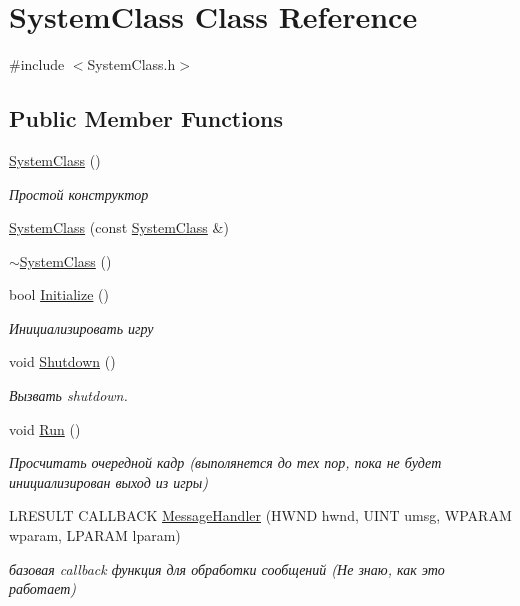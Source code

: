 \hypertarget{class_system_class}{}\section{System\+Class Class Reference}
\label{class_system_class}


{\ttfamily \#include $<$System\+Class.\+h$>$}

\subsection*{Public Member Functions}
\begin{DoxyCompactItemize}
\item 
\hyperlink{class_system_class_ac8a9c3545ea8749f149a49219d5f7c20}{System\+Class} ()
\begin{DoxyCompactList}\small\item\em Простой конструктор \end{DoxyCompactList}\item 
\hyperlink{class_system_class_a3b14141f929e92fb9cf9a73bb88ce443}{System\+Class} (const \hyperlink{class_system_class}{System\+Class} \&)
\item 
\hyperlink{class_system_class_aa0c6aed1875b97d8260ad264a9d95e60}{$\sim$\+System\+Class} ()
\item 
bool \hyperlink{class_system_class_a21f9acab8652feb8cbb8858afc91815a}{Initialize} ()
\begin{DoxyCompactList}\small\item\em Инициализировать игру \end{DoxyCompactList}\item 
void \hyperlink{class_system_class_a86b7353d60fb279bd1a65c970a216bec}{Shutdown} ()
\begin{DoxyCompactList}\small\item\em Вызвать shutdown. \end{DoxyCompactList}\item 
void \hyperlink{class_system_class_ae3ba97d5f471516481350266cb6c3cab}{Run} ()
\begin{DoxyCompactList}\small\item\em Просчитать очередной кадр (выполянется до тех пор, пока не будет инициализирован выход из игры) \end{DoxyCompactList}\item 
L\+R\+E\+S\+U\+LT C\+A\+L\+L\+B\+A\+CK \hyperlink{class_system_class_aeb0f9940a9a82a36f13e267e3989a98b}{Message\+Handler} (H\+W\+ND hwnd, U\+I\+NT umsg, W\+P\+A\+R\+AM wparam, L\+P\+A\+R\+AM lparam)
\begin{DoxyCompactList}\small\item\em базовая callback функция для обработки сообщений (Не знаю, как это работает) \end{DoxyCompactList}\end{DoxyCompactItemize}
